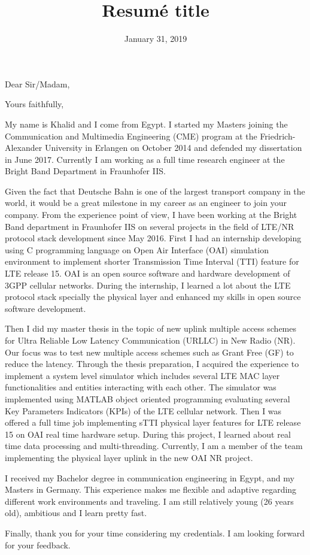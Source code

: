 \documentclass[11pt,a4paper,sans]{moderncv}        %
\title{Resumé title}                               %
\begin{document}
\date{January 31, 2019}
\opening{Dear Sir/Madam,}
\closing{Yours faithfully,}
\makelettertitle

My name is Khalid and I come from Egypt. I started my Masters joining the Communication and Multimedia Engineering (CME) program at the Friedrich-Alexander University in Erlangen on October 2014 and defended my dissertation in June 2017. Currently I am working as a full time research engineer at the Bright Band Department in Fraunhofer IIS. 

Given the fact that Deutsche Bahn is one of the largest transport company in the world, it would be a great milestone in my career as an engineer to join your company. From the experience point of view, I have been working at the Bright Band department in Fraunhofer IIS on several projects in the field of LTE/NR protocol stack development since May 2016. First I had an internship developing using C programming language on Open Air Interface (OAI) simulation environment to implement shorter Transmission Time Interval (TTI) feature for LTE release 15. OAI is an open source software and hardware development of 3GPP cellular networks. During the internship, I learned a lot about the LTE protocol stack specially the physical layer and enhanced my skills in open source software development. 

Then I did my master thesis in the topic of new uplink multiple access schemes for Ultra Reliable Low Latency Communication (URLLC) in New Radio (NR). Our focus was to test new multiple access schemes such as Grant Free (GF) to reduce the latency. Through the thesis preparation, I acquired the experience to implement a system level simulator which includes several LTE MAC layer functionalities and entities interacting with each other. The simulator was implemented using MATLAB object oriented programming evaluating several Key Parameters Indicators (KPIs) of the LTE cellular network. Then I was offered a full time job implementing sTTI physical layer features for LTE release 15 on OAI real time hardware setup. During this project, I learned about real time data processing and multi-threading. Currently, I am a member of the team implementing the physical layer uplink in the new OAI NR project.  

I received my Bachelor degree in communication engineering in Egypt, and my Masters in Germany. This experience makes me flexible and adaptive regarding different work environments and traveling. I am still relatively young (26 years old), ambitious and I learn pretty fast. 

Finally, thank you for your time considering my credentials. 
I am looking forward for your feedback.

\makeletterclosing
\end{document}
